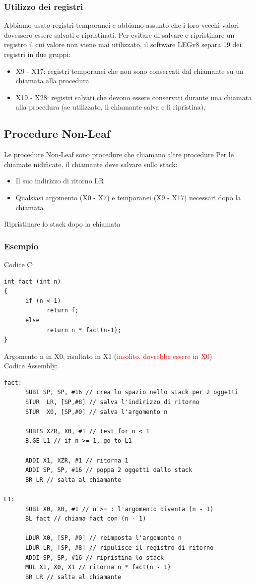 \documentclass[12pt,a4paper]{article}
\begin{document}
\subsubsection{Utilizzo dei registri}
Abbiamo usato registri temporanei e abbiamo assunto che i loro vecchi valori dovessero essere salvati e ripristinati. Per evitare di salvare e ripristinare un registro il cui valore non viene mai utilizzato, il software LEGv8 separa 19 dei registri in due gruppi:
\begin{itemize}
\item X9 - X17: registri temporanei che non sono conservati dal chiamante su un chiamata alla procedura.
\item X19 - X28: registri salvati che devono essere conservati durante una chiamata alla procedura (se utilizzato, il chiamante salva e li ripristina).
\end{itemize}

\subsection{Procedure Non-Leaf}
Le procedure Non-Leaf sono procedure che chiamano altre procedure Per le chiamate nidificate, il chiamante deve salvare sullo stack:
\begin{itemize}
\item Il suo indirizzo di ritorno LR
\item Qualsiasi argomento (X0 - X7) e temporanei (X9 - X17) necessari dopo la chiamata
\end{itemize}
Ripristinare lo stack dopo la chiamata

\subsubsection{Esempio}
Codice C:
\begin{verbatim}
int fact (int n)
{
      if (n < 1)
            return f;
      else
            return n * fact(n-1);
}
\end{verbatim}
Argomento n in X0, risultato in X1 (\textcolor{red}{insolito, dovrebbe essere in X0})\\
Codice Assembly:
\begin{verbatim}
fact:
      SUBI SP, SP, #16 // crea lo spazio nello stack per 2 oggetti
      STUR  LR, [SP,#8] // salva l'indirizzo di ritorno
      STUR  X0, [SP,#0] // salva l'argomento n

      SUBIS XZR, X0, #1 // test for n < 1 
      B.GE L1 // if n >= 1, go to L1
      
      ADDI X1, XZR, #1 // ritorna 1
      ADDI SP, SP, #16 // poppa 2 oggetti dallo stack
      BR LR // salta al chiamante
      
L1:
      SUBI X0, X0, #1 // n >= : l'argomento diventa (n - 1)
      BL fact // chiama fact con (n - 1)
      
      LDUR X0, [SP, #0] // reimposta l'argomento n
      LDUR LR, [SP, #8] // ripulisce il registro di ritorno
      ADDI SP, SP, #16 // ripristina lo stack
      MUL X1, X0, X1 // ritorna n * fact(n - 1)
      BR LR // salta al chiamante
\end{verbatim}
\end{document}
